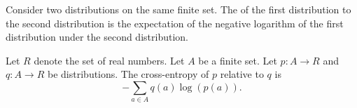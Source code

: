
\sbasic

















\sstart
{}



Consider two distributions
on the same finite set.
The 
of the first distribution
 to the
second distribution
is the expectation of the
negative logarithm of the first distribution
under the second distribution.


Let $R$ denote the set of
real numbers. Let
$A$ be a finite set.
Let $p: A \to R$ and
$q: A \to R$ be distributions.
The cross-entropy of $p$ relative to $q$
is
\[
  -\sum_{a \in A} q(a) \log(p(a)).
\]
\strats
